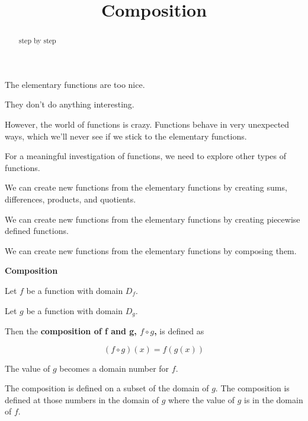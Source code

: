 \documentclass{ximera}
\title{Composition}
\begin{document}
\begin{abstract}
step by step
\end{abstract}
\maketitle



The elementary functions are too nice.

They don't do anything interesting.

However, the world of functions is crazy.  Functions behave in very unexpected ways, which we'll never see if we stick to the elementary functions.

For a meaningful investigation of functions, we need to explore other types of functions.

We can create new functions from the elementary functions by creating sums, differences, products, and quotients.


We can create new functions from the elementary functions by creating piecewise defined functions.


We can create new functions from the elementary functions by composing them. 




\begin{template} \textbf{\textcolor{blue!55!black}{Composition}}  


Let $f$ be a function with domain $D_f$.


Let $g$ be a function with domain $D_g$.




Then the \textbf{composition of f and g, $f \circ g$,} is defined as

\[
(f \circ g)(x) = f(g(x))
\] 


The value of $g$ becomes a domain number for $f$.


The composition is defined on a subset of the domain of $g$.  The composition is defined at those numbers in the domain of $g$ where the value of $g$ is in the domain of $f$.




\end{template}
\end{document}
